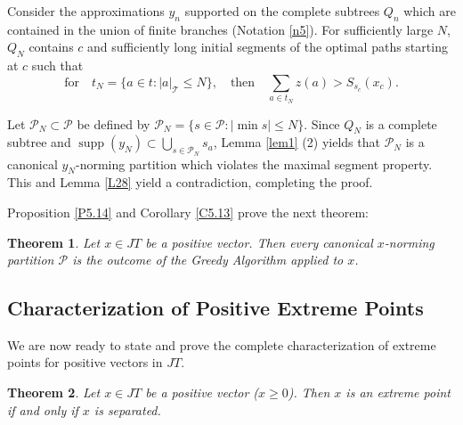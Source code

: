\documentclass[11pt,a4paper]{amsart}
\newtheorem{theorem}{Theorem}[section]
\newcommand{\JT}{JT}
\newcommand{\Tree}{\mathcal{T}}
\newcommand{\supp}{\operatorname{supp}}
\begin{document}
    Consider the approximations $y_n$ supported on the complete subtrees $Q_n$ which are contained in the union of finite branches (Notation \ref{n5}). For sufficiently large $N$, $Q_N$ contains $c$ and sufficiently long initial segments of the optimal paths starting at $c$ such that 
      \[ \text{for} \quad  t_N = \{ a\in t: |a|_\Tree \le N\}, \quad \text{then} \quad  \sum_{a\in t_N } z(a) > S_{s_c} (x_c). \]
    
    Let $\mathcal{P}_N \subset \mathcal{P}$ be defined by $\mathcal{P}_N = \{ s \in \mathcal{P} : |\min s| \le N\}$. Since $Q_N$ is a complete subtree and $\supp(y_N) \subset \bigcup_{s\in \mathcal{P}_{N} } s_a$, Lemma \ref{lem1} (2) yields that $\mathcal{P}_N$ is a canonical $y_N$-norming partition which violates the maximal segment property. This and Lemma \ref{L28} 
    yield a contradiction, completing the proof.
    
    Proposition \ref{P5.14} and Corollary \ref{C5.13} prove the next theorem:
    \begin{theorem}
      Let $x \in \JT$ be a positive vector. Then every canonical $x$-norming partition $\mathcal{P}$ is the outcome of the Greedy Algorithm applied to $x$.
    \end{theorem}
  
\subsection{Characterization of Positive Extreme Points}

We are now ready to state and prove the complete characterization of extreme points for positive vectors in $\JT$.

\begin{theorem}
    Let $x \in \JT$ be a positive vector ($x \ge 0$). Then $x$ is an extreme point if and only if $x$ is separated.
\end{theorem}
\end{document}
